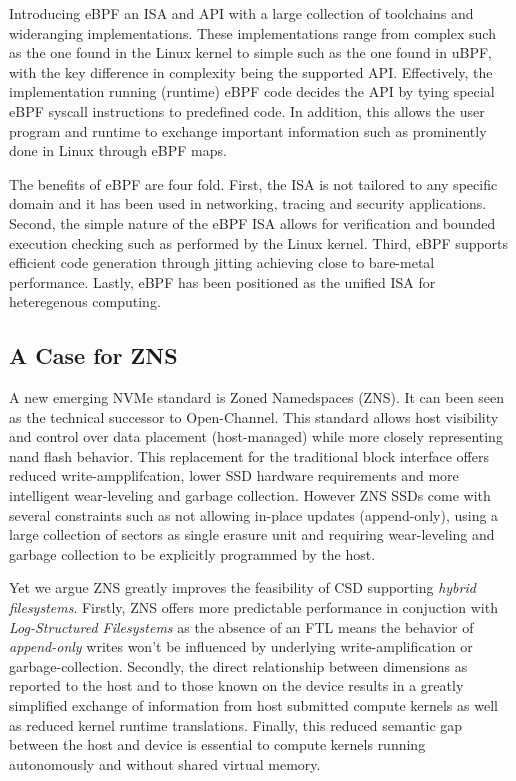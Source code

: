 \documentclass[conference]{IEEEtran}
\begin{document}
Introducing eBPF an ISA and API with a large collection of toolchains and
wideranging implementations\cite{what-ebpf, McCanne1993TheBP}. These
implementations range from complex such as the one found in the Linux kernel to
simple such as the one found in uBPF\cite{ubpf}, with the key difference in
complexity being the supported API. Effectively, the implementation running
(runtime) eBPF code decides the API by tying special eBPF syscall instructions
to predefined code. In addition, this allows the user program and runtime to
exchange important information such as prominently done in Linux through eBPF
maps\cite{bpf-man}.

The benefits of eBPF are four fold. First, the ISA is not tailored to any
specific domain and it has been used in networking\cite{xdp},
tracing\cite{enhanced-ebpf} and security\cite{seccomp} applications. Second,
the simple nature of the eBPF ISA allows for verification and bounded execution
checking such as performed by the Linux kernel\cite{kern-analysis}. Third, eBPF
supports efficient code generation through jitting achieving close to bare-metal
performance. Lastly, eBPF has been positioned as the unified ISA for
heteregenous computing\cite{Brunella2020hXDPES, bpf-uapi}.

\subsection*{A Case for ZNS}

A new emerging NVMe standard is Zoned Namedspaces (ZNS). It can been seen as the
technical successor to Open-Channel\cite{}. This standard allows host visibility
and control over data placement (host-managed) while more closely representing
nand flash behavior. This replacement for the traditional block interface offers
reduced write-ampplifcation, lower SSD hardware requirements and more
intelligent wear-leveling and garbage collection. However ZNS SSDs come with
several constraints such as not allowing in-place updates (append-only), using a
large collection of sectors as single erasure unit and requiring wear-leveling
and garbage collection to be explicitly programmed by the host.

Yet we argue ZNS greatly improves the feasibility of CSD supporting
\textit{hybrid filesystems}. Firstly, ZNS offers more predictable performance in
conjuction with \textit{Log-Structured Filesystems} as the absence of an FTL
means the behavior of \textit{append-only} writes won't be influenced by
underlying write-amplification or garbage-collection. Secondly, the direct
relationship between dimensions as reported to the host and to those known on
the device results in a greatly simplified exchange of information from host
submitted compute kernels as well as reduced kernel runtime translations.
Finally, this reduced semantic gap between the host and device is essential to
compute kernels running autonomously and without shared virtual memory.
\end{document}
